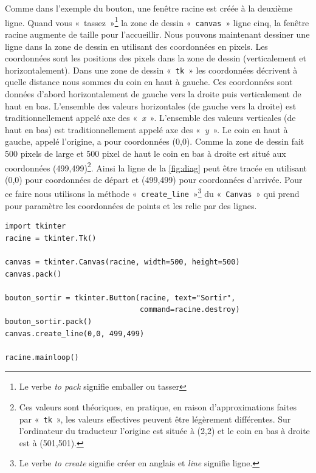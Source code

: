 Comme dans l'exemple du bouton, une fenêtre racine est créée à la deuxième ligne. Quand vous « tassez »\footnote{Le verbe \emph{to pack} signifie emballer ou tasser} la zone de dessin « \texttt{canvas} » ligne cinq, la fenêtre racine augmente de taille pour l'accueillir. Nous pouvons maintenant dessiner une ligne dans la zone de dessin en utilisant des coordonnées en pixels. Les coordonnées sont les positions des pixels dans la zone de dessin (verticalement et horizontalement). Dans une zone de dessin « \texttt{tk} »  les coordonnées décrivent à quelle distance nous sommes du coin en haut à gauche. Ces coordonnées sont données d'abord horizontalement de gauche vers la droite puis verticalement de haut en bas. L'ensemble des valeurs horizontales (de gauche vers la droite) est traditionnellement appelé axe des « \emph{x} ». L'ensemble des valeurs verticales (de haut en bas) est traditionnellement appelé axe des « \emph{y} ». Le coin en haut à gauche, appelé l'origine, a pour coordonnées (0,0). Comme la zone de dessin fait 500 pixels de large et 500 pixel de haut le coin en bas à droite est situé aux coordonnées (499,499)\footnote{Ces valeurs sont théoriques, en pratique, en raison d'approximations faites par « \texttt{tk} », les valeurs effectives peuvent être légèrement différentes. Sur l'ordinateur du traducteur l'origine est située à (2,2) et le coin en bas à droite est à (501,501).}. Ainsi la ligne de la \autoref{fig:diag} peut être tracée en utilisant (0,0) pour coordonnées de départ et (499,499) pour coordonnées d'arrivée. Pour ce faire nous utilisons la méthode « \texttt{create\_line} »\footnote{Le verbe \emph{to create} signifie créer en anglais et \emph{line} signifie ligne.} du « \texttt{Canvas} » qui prend pour paramètre les coordonnées de points et les relie par des lignes. 
\begin{Verbatim}[frame=single,rulecolor=\color{mbleu}, label=à taper]
import tkinter
racine = tkinter.Tk()

canvas = tkinter.Canvas(racine, width=500, height=500)
canvas.pack()

bouton_sortir = tkinter.Button(racine, text="Sortir",
                               command=racine.destroy)
bouton_sortir.pack()
canvas.create_line(0,0, 499,499)

racine.mainloop()
\end{Verbatim}

